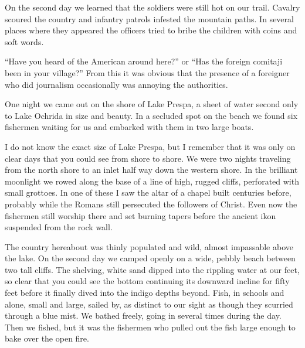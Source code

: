 \documentclass[a5paper,12pt]{book}
\begin{document}
On the second day we learned that the soldiers were still hot on our trail. Cavalry scoured the country and infantry patrols infested the mountain paths. In several places where they appeared the officers tried to bribe the children with coins and soft words.

“Have you heard of the American around here?” or “Has the foreign comitaji been in your village?” From this it was obvious that the presence of a foreigner who did journalism occasionally was annoying the authorities.

One night we came out on the shore of Lake Prespa, a sheet of water second only to Lake Ochrida in size and beauty. In a secluded spot on the beach we found six fishermen waiting for us and embarked with them in two large boats.

I do not know the exact size of Lake Prespa, but I remember that it was only on clear days that you could see from shore to shore. We were two nights traveling from the north shore to an inlet half way down the western shore. In the brilliant moonlight we rowed along the base of a line of high, rugged cliffs, perforated with small grottoes. In one of these I saw the altar of a chapel built centuries before, probably while the Romans still persecuted the followers of Christ. Even now the fishermen still worship there and set burning tapers before the ancient ikon suspended from the rock wall.

The country hereabout was thinly populated and wild, almost impassable above the lake. On the second day we camped openly on a wide, pebbly beach between two tall cliffs. The shelving, white sand dipped into the rippling water at our feet, so clear that you could see the bottom continuing its downward incline for fifty feet before it finally dived into the indigo depths beyond. Fish, in schools and alone, small and large, sailed by, as distinct to our sight as though they scurried through a blue mist. We bathed freely, going in several times during the day. Then we fished, but it was the fishermen who pulled out the fish large enough to bake over the open fire.
\end{document}
